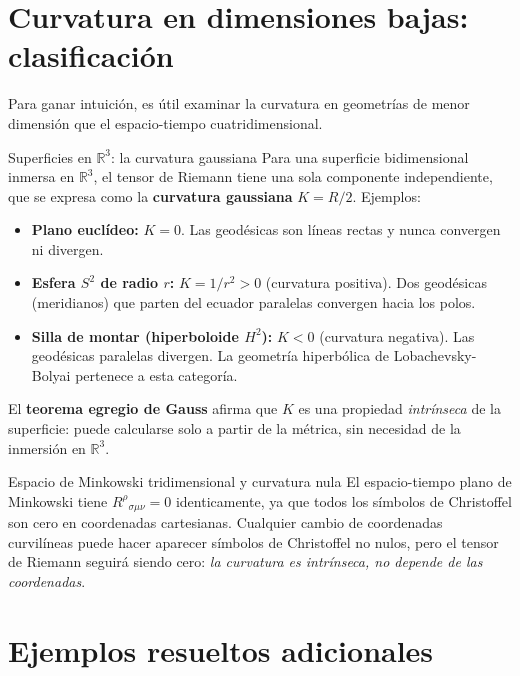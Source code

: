 \section{Curvatura en dimensiones bajas: clasificación}

Para ganar intuición, es útil examinar la curvatura en geometrías de menor dimensión que el espacio-tiempo cuatridimensional.

\begin{ejemplo}{Superficies en $\mathbb{R}^3$: la curvatura gaussiana}{}
Para una superficie bidimensional inmersa en $\mathbb{R}^3$, el tensor de Riemann tiene una sola componente independiente, que se expresa como la \textbf{curvatura gaussiana} $K = R/2$. Ejemplos:
\begin{itemize}[leftmargin=2em]
  \item \textbf{Plano euclídeo:} $K = 0$. Las geodésicas son líneas rectas y nunca convergen ni divergen.
  \item \textbf{Esfera $S^2$ de radio $r$:} $K = 1/r^2 > 0$ (curvatura positiva). Dos geodésicas (meridianos) que parten del ecuador paralelas convergen hacia los polos.
  \item \textbf{Silla de montar (hiperboloide $H^2$):} $K < 0$ (curvatura negativa). Las geodésicas paralelas divergen. La geometría hiperbólica de Lobachevsky-Bolyai pertenece a esta categoría.
\end{itemize}
El \textbf{teorema egregio de Gauss} afirma que $K$ es una propiedad \emph{intrínseca} de la superficie: puede calcularse solo a partir de la métrica, sin necesidad de la inmersión en $\mathbb{R}^3$.
\end{ejemplo}

\begin{ejemplo}{Espacio de Minkowski tridimensional y curvatura nula}{}
El espacio-tiempo plano de Minkowski tiene $R^\rho{}_{\sigma\mu\nu} = 0$ identicamente, ya que todos los símbolos de Christoffel son cero en coordenadas cartesianas. Cualquier cambio de coordenadas curvilíneas puede hacer aparecer símbolos de Christoffel no nulos, pero el tensor de Riemann seguirá siendo cero: \emph{la curvatura es intrínseca, no depende de las coordenadas}.
\end{ejemplo}

\section{Ejemplos resueltos adicionales}

